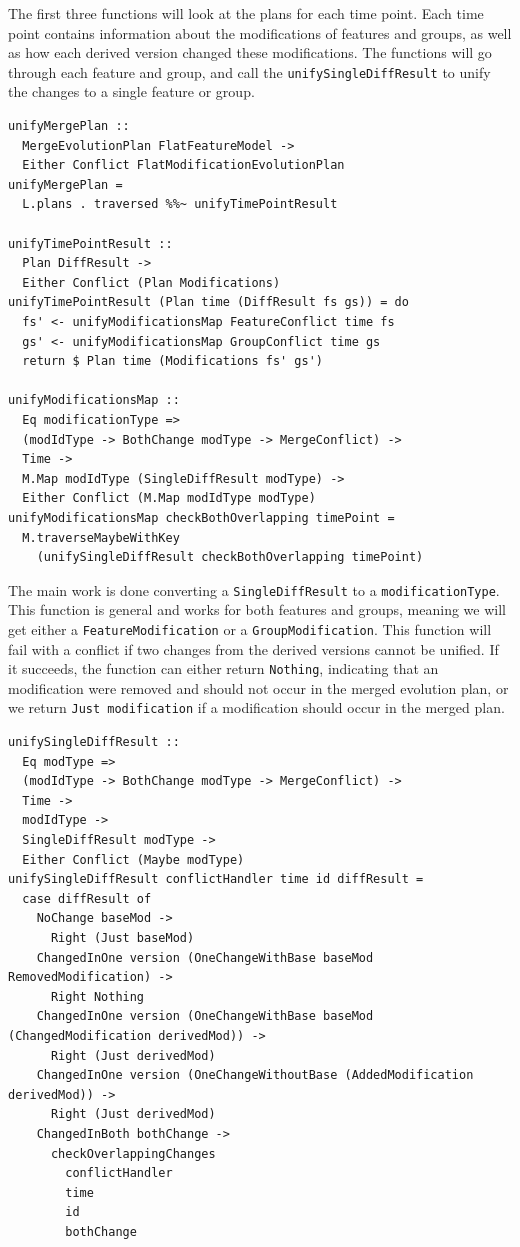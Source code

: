 \documentclass[a4paper,english]{ifimaster}
\begin{document}
The first three functions will look at the plans for each time point. Each time point contains information about the modifications of features and groups, as well as how each derived version changed these modifications. The functions will go through each feature and group, and call the \texttt{unifySingleDiffResult} to unify the changes to a single feature or group.

\begin{verbatim}
unifyMergePlan ::
  MergeEvolutionPlan FlatFeatureModel ->
  Either Conflict FlatModificationEvolutionPlan
unifyMergePlan =
  L.plans . traversed %%~ unifyTimePointResult

unifyTimePointResult ::
  Plan DiffResult ->
  Either Conflict (Plan Modifications)
unifyTimePointResult (Plan time (DiffResult fs gs)) = do
  fs' <- unifyModificationsMap FeatureConflict time fs
  gs' <- unifyModificationsMap GroupConflict time gs
  return $ Plan time (Modifications fs' gs')

unifyModificationsMap ::
  Eq modificationType =>
  (modIdType -> BothChange modType -> MergeConflict) ->
  Time ->
  M.Map modIdType (SingleDiffResult modType) ->
  Either Conflict (M.Map modIdType modType)
unifyModificationsMap checkBothOverlapping timePoint =
  M.traverseMaybeWithKey
    (unifySingleDiffResult checkBothOverlapping timePoint)
\end{verbatim}

The main work is done converting a \texttt{SingleDiffResult} to a \texttt{modificationType}. This function is general and works for both features and groups, meaning we will get either a \texttt{FeatureModification} or a \texttt{GroupModification}. This function will fail with a conflict if two changes from the derived versions cannot be unified. If it succeeds, the function can either return \texttt{Nothing}, indicating that an modification were removed and should not occur in the merged evolution plan, or we return \texttt{Just modification} if a modification should occur in the merged plan.

\begin{verbatim}
unifySingleDiffResult ::
  Eq modType =>
  (modIdType -> BothChange modType -> MergeConflict) ->
  Time ->
  modIdType ->
  SingleDiffResult modType ->
  Either Conflict (Maybe modType)
unifySingleDiffResult conflictHandler time id diffResult =
  case diffResult of
    NoChange baseMod ->
      Right (Just baseMod)
    ChangedInOne version (OneChangeWithBase baseMod RemovedModification) ->
      Right Nothing
    ChangedInOne version (OneChangeWithBase baseMod (ChangedModification derivedMod)) ->
      Right (Just derivedMod)
    ChangedInOne version (OneChangeWithoutBase (AddedModification derivedMod)) ->
      Right (Just derivedMod)
    ChangedInBoth bothChange ->
      checkOverlappingChanges
        conflictHandler
        time
        id
        bothChange
\end{verbatim}
\end{document}
